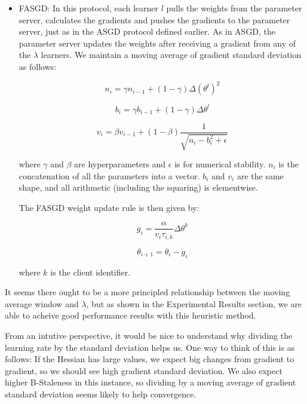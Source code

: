 \documentclass{article} %
\begin{document}
\begin{itemize}
\item FASGD: In this protocol, each learner $l$ pulls the weights from the parameter server,
  calculates the gradients and pushes the gradients to the parameter server,
  just as in the ASGD protocol defined earlier.
  As in ASGD, the parameter server updates
  the weights after receiving a gradient
  from any of the $\lambda$ learners.
  We maintain a moving average of gradient standard deviation as follows:

\begin{equation}
  n_i = \gamma n_{i-1} + (1 - \gamma) \Delta (\theta^l)^2
\end{equation}

\begin{equation}
   b_i = \gamma b_{i-1} + (1 - \gamma) \Delta \theta^l 
\end{equation}

\begin{equation}
   v_i = \beta  v_{i-1} + (1 - \beta)  \frac{1}{\sqrt{n_i - b_i^2 + \epsilon}}
\end{equation}
  
  where $\gamma$ and $\beta$ are hyperparameters and $\epsilon$ is for numerical
  stability. $n_i$ is the concatenation of all the parameters into a vector.
  $b_i$ and $v_i$ are the same shape, and all arithmetic (including the squaring)
  is elementwise.

  The FASGD weight update rule is then given by:

\begin{equation}
    g_i =  \frac{\alpha}{v_i \tau_{i,k}}\Delta \theta^k
\end{equation}

\begin{equation}
   \theta_{i + 1} = \theta_{i} - g_i 
\end{equation}

  where $k$ is the client identifier.  
  
\end{itemize}
It seems there ought to be a more principled relationship between the moving average
window and $\lambda$, but as shown in the Experimental Results section, we
are able to acheive good performance results with this heuristic method.

From an intutive perspective, it would be nice to understand why
dividing the learning rate by the standard deviation helps us.
One way to think of this is as follows:
If the Hessian has large values, we expect big changes from gradient to gradient,
so we should see high gradient standard deviation.
We also expect higher B-Staleness in this instance,
so dividing by a moving average of gradient standard deviation seems likely to help convergence.
\end{document}

